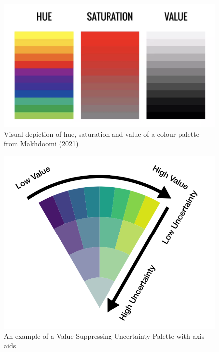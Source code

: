 \documentclass[
  letterpaper,
  DIV=11,
  numbers=noendperiod]{scrartcl}
\begin{document}
\begin{figure}

{\centering \includegraphics{huesatval.png}

}

\caption{\label{fig-huesatcol}Visual depiction of hue, saturation and
value of a colour palette from Makhdoomi (2021)}

\end{figure}

\begin{figure}

{\centering \includegraphics{vsup.png}

}

\caption{\label{fig-vsup}An example of a Value-Suppressing Uncertainty
Palette with axis aids}

\end{figure}
\end{document}
